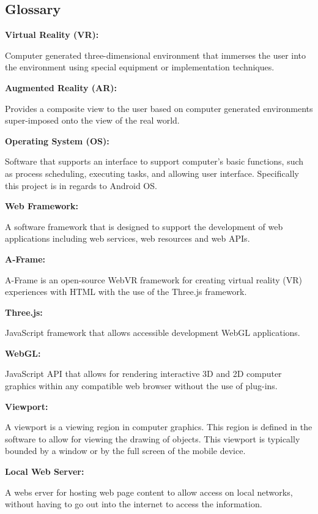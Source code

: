 \documentclass[letterpaper,10pt,titlepage,draftclsnofoot,onecolumn,compsoc,utf8,latin1]{IEEEtran}
\begin{document}
\subsection{Glossary}
\begin{singlespace}
\begin{enumerate}[labelsep=2em,leftmargin=.5in]
    {\item \bfseries Virtual Reality (VR): } Computer generated three-dimensional environment that immerses the user into the environment using special equipment or implementation techniques. \vspace{.1cm}
    {\item \bfseries Augmented Reality (AR): } Provides a composite view to the user based on computer generated environments super-imposed onto the view of the real world. \vspace{.1cm}
    {\item \bfseries Operating System (OS): } Software that supports an interface to support computer's basic functions, such as process scheduling, executing tasks, and allowing user interface. Specifically this project is in regards to Android OS. \vspace{.1cm}
    {\item \bfseries Web Framework: } A software framework that is designed to support the development of web applications including web services, web resources and web APIs. \vspace{.1cm}
    {\item \bfseries A-Frame: } A-Frame is an open-source WebVR framework for creating virtual reality (VR) experiences with HTML with the use of the Three.js framework.\vspace{.1cm}
    {\item \bfseries Three.js: } JavaScript framework that allows accessible development WebGL applications. \vspace{.1cm}
    {\item \bfseries WebGL: } JavaScript API that allows for rendering interactive 3D and 2D computer graphics within any compatible web browser without the use of plug-ins. \vspace{.1cm}
    {\item \bfseries Viewport: } A viewport is a viewing region in computer graphics. This region is defined in the software to allow for viewing the drawing of objects. This viewport is typically bounded by a window or by the full screen of the mobile device. \vspace{.1cm}
    {\item \bfseries Local Web Server: } A webs erver for hosting web page content to allow access on local networks, without having to go out into the internet to access the information. \vspace{.1cm}

\end{enumerate}
\end{singlespace}
\end{document}

